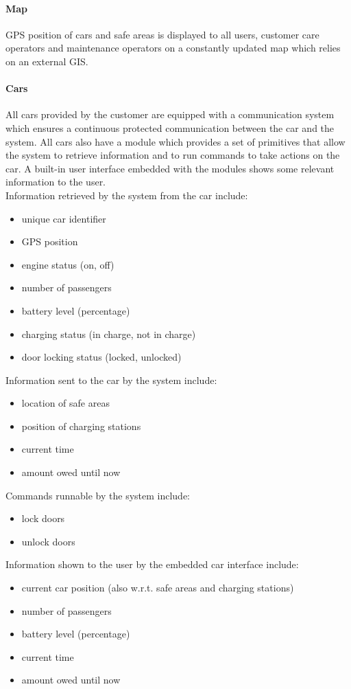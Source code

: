 	\paragraph{Map} GPS position of cars and safe areas is displayed to all users, customer care operators and maintenance operators on a constantly updated map which relies on an external GIS.

	\paragraph{Cars}\label{sec:cars}All cars provided by the customer are equipped with a communication system which ensures a continuous protected communication between the car and the system. All cars also have a module which provides a set of primitives that allow the system to retrieve information and to run commands to take actions on the car. A built-in user interface embedded with the modules shows some relevant information to the user.\\
	Information retrieved by the system from the car include:
	\begin{itemize}
		\item unique car identifier
		\item GPS position
		\item engine status (on, off)
		\item number of passengers
		\item battery level (percentage)
		\item charging status (in charge, not in charge)
		\item door locking status (locked, unlocked)
	\end{itemize}
	Information sent to the car by the system include:
	\begin{itemize}
		\item location of safe areas
		\item position of charging stations
		\item current time
		\item amount owed until now
	\end{itemize}
	Commands runnable by the system include:
	\begin{itemize}
		\item lock doors
		\item unlock doors
	\end{itemize}		
	Information shown to the user by the embedded car interface include:
	\begin{itemize}
		\item current car position (also w.r.t. safe areas and charging stations)
		\item number of passengers
		\item battery level (percentage)
		\item current time
		\item amount owed until now
	\end{itemize}
	
